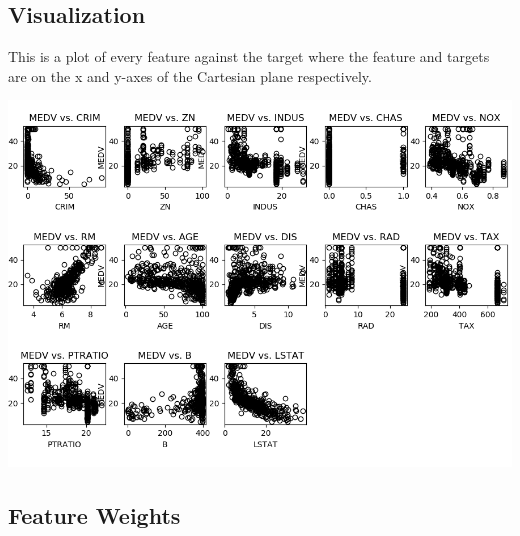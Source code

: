 \documentclass[10pt]{article}
\begin{document}
\pagebreak
\subsection{Visualization}
This is a plot of every feature against the target where the feature and targets are on the x and y-axes of the Cartesian plane respectively. 

\includegraphics[scale=0.74]{plot.png}

\pagebreak

\subsection{Feature Weights}
\end{document}

